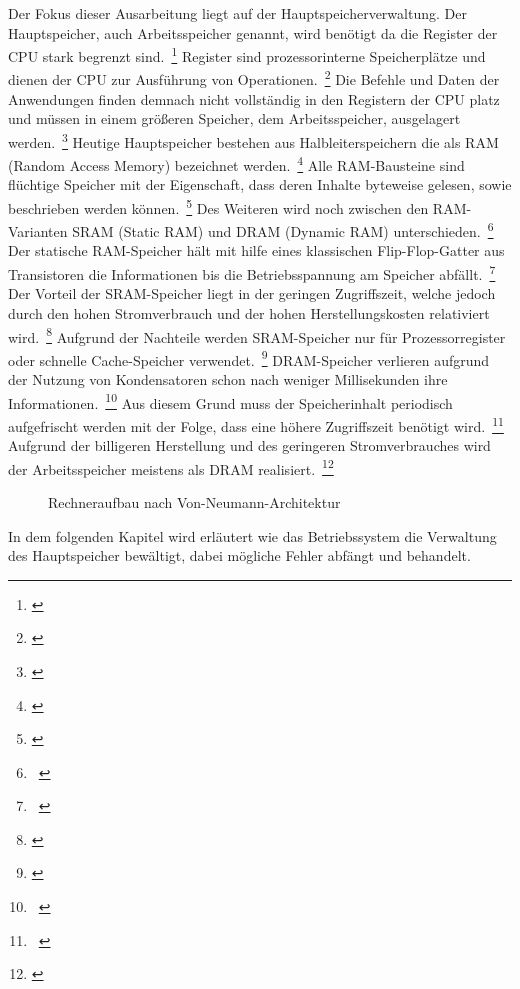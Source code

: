Der Fokus dieser Ausarbeitung liegt auf der Hauptspeicherverwaltung. Der Hauptspeicher, auch Arbeitsspeicher genannt, wird benötigt da die Register der CPU stark begrenzt sind.~\footnote{\cite[S.~107]{Herold.2012}} Register sind prozessorinterne Speicherplätze und dienen der CPU zur Ausführung von Operationen.~\footnote{\cite[S.~98]{Herold.2012}} Die Befehle und Daten der Anwendungen finden demnach nicht vollständig in den Registern der CPU platz und müssen in einem größeren Speicher, dem Arbeitsspeicher, ausgelagert werden.~\footnote{\cite[S.~107]{Herold.2012}} Heutige Hauptspeicher bestehen aus Halbleiterspeichern die als RAM (Random Access Memory) bezeichnet werden.~\footnote{\cite[S.~108]{Herold.2012}} Alle RAM-Bausteine sind flüchtige Speicher mit der Eigenschaft, dass deren Inhalte byteweise gelesen, sowie beschrieben werden können.~\footnote{\cite[S.~108]{Herold.2012}} Des Weiteren wird noch zwischen den RAM-Varianten SRAM (Static RAM) und DRAM (Dynamic RAM) unterschieden.~\footnote{~\cite[S.~182]{Haberlein.2011}} Der statische RAM-Speicher hält mit hilfe eines klassischen Flip-Flop-Gatter aus Transistoren die Informationen bis die Betriebsspannung am Speicher abfällt.~\footnote{~\cite[S.~182]{Haberlein.2011}} Der Vorteil der SRAM-Speicher liegt in der geringen Zugriffszeit, welche jedoch durch den hohen Stromverbrauch und der hohen Herstellungskosten relativiert wird.~\footnote{\cite[S.~108]{Herold.2012}} Aufgrund der Nachteile werden SRAM-Speicher nur für Prozessorregister oder schnelle Cache-Speicher verwendet.~\footnote{\cite[S.~108]{Herold.2012}} DRAM-Speicher verlieren aufgrund der Nutzung von Kondensatoren schon nach weniger Millisekunden ihre Informationen.~\footnote{~\cite[S.~183]{Haberlein.2011}} Aus diesem Grund muss der Speicherinhalt periodisch aufgefrischt werden mit der Folge, dass eine höhere Zugriffszeit benötigt wird.~\footnote{~\cite[S.~183]{Haberlein.2011}} Aufgrund der billigeren Herstellung und des geringeren Stromverbrauches wird der Arbeitsspeicher meistens als DRAM realisiert.~\footnote{\cite[S.~109]{Herold.2012}}

\begin{figure}[htb]
	\centering
	\caption{Rechneraufbau nach Von-Neumann-Architektur}
\end{figure}

In dem folgenden Kapitel wird erläutert wie das Betriebssystem die Verwaltung des Hauptspeicher bewältigt, dabei mögliche Fehler abfängt und behandelt.
